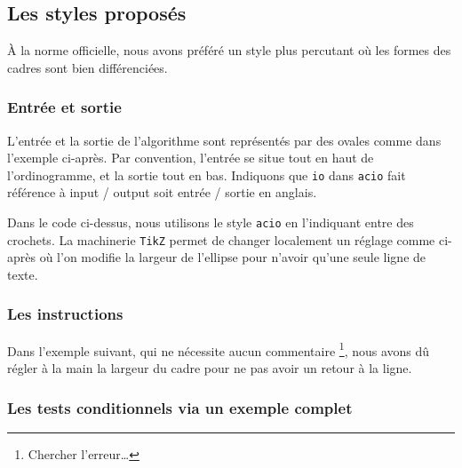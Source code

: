 \documentclass[12pt,a4paper]{article}
\begin{document}

\subsection{Les styles proposés}

À la norme officielle, nous avons préféré un style plus percutant où les formes des cadres sont bien différenciées.




\subsubsection{Entrée et sortie}

L'entrée et la sortie de l'algorithme sont représentés par des ovales comme dans l'exemple ci-après. Par convention, l'entrée se situe tout en haut de l'ordinogramme, et la sortie tout en bas.
Indiquons que \verb+io+ dans \verb+acio+ fait référence à \og input / output \fg{} soit \og entrée / sortie \fg{} en anglais.



Dans le code ci-dessus, nous utilisons le style \verb+acio+ en l'indiquant entre des crochets.
La machinerie \verb#TikZ# permet de changer localement un réglage comme ci-après où l'on modifie la largeur de l'ellipse pour n'avoir qu'une seule ligne de texte.





\subsubsection{Les instructions}

Dans l'exemple suivant, qui ne nécessite aucun commentaire
\footnote{
	Chercher l'erreur\dots
},
nous avons dû régler à la main la largeur du cadre pour ne pas avoir un retour à la ligne.






\subsubsection{Les tests conditionnels via un exemple complet}
\end{document}

